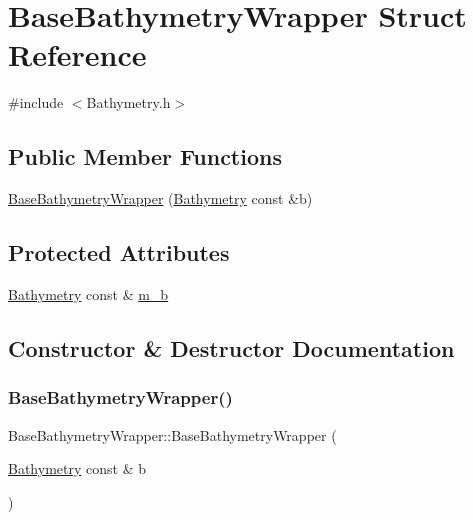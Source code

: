\hypertarget{structBaseBathymetryWrapper}{}\section{Base\+Bathymetry\+Wrapper Struct Reference}
\label{structBaseBathymetryWrapper}


{\ttfamily \#include $<$Bathymetry.\+h$>$}

\subsection*{Public Member Functions}
\begin{DoxyCompactItemize}
\item 
\hyperlink{structBaseBathymetryWrapper_a438cd64feea081d302f66a7e48a8486b}{Base\+Bathymetry\+Wrapper} (\hyperlink{structBathymetry}{Bathymetry} const \&b)
\end{DoxyCompactItemize}
\subsection*{Protected Attributes}
\begin{DoxyCompactItemize}
\item 
\hyperlink{structBathymetry}{Bathymetry} const  \& \hyperlink{structBaseBathymetryWrapper_a9f4c7c78449986de437fec9f0b556f06}{m\+\_\+b}
\end{DoxyCompactItemize}


\subsection{Constructor \& Destructor Documentation}
\mbox{\label{structBaseBathymetryWrapper_a438cd64feea081d302f66a7e48a8486b}} 
\subsubsection{\texorpdfstring{Base\+Bathymetry\+Wrapper()}{BaseBathymetryWrapper()}}
{\footnotesize\ttfamily Base\+Bathymetry\+Wrapper\+::\+Base\+Bathymetry\+Wrapper (\begin{DoxyParamCaption}\item[{\hyperlink{structBathymetry}{Bathymetry} const \&}]{b }\end{DoxyParamCaption})\hspace{0.3cm}{\ttfamily [explicit]}}



